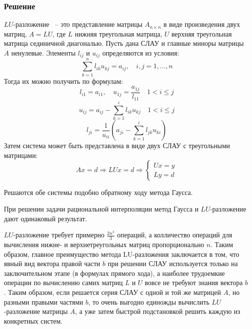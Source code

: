 \documentclass[a4paper, fontsize=14pt]{article}
\begin{document}
\subsubsection*{Решение}
$LU$-разложение ~-- это представление матрицы $A_{n\times n}$ в виде произведения двух матриц, $A = LU$, где $L$ нижняя треугольная матрица, $U$ верхняя треугольная матрица сединичной диагональю.
Пусть дана СЛАУ и главные миноры матрицы $A$ ненулевые. Элементы $l_{ij}$ и $u_{ij}$ определяются из условия:
\begin{equation*}
    \sum_{k=1}^{n} l_{ik} u_{kj} = a_{ij}, \quad i,j = 1, \dots, n
\end{equation*}
Тогда их можно получить по формулам:
\begin{equation*}
    l_{i1} = a_{i1}, \quad u_{1j} = \frac{a_{1j}}{l_{11}} \quad 1 < i \leq j
\end{equation*}
\begin{equation*}
    u_{ij} = a_{ij} - \sum_{k=1}^i l_{ik} u_{kj} \quad 1 < i \leq j
\end{equation*}
\begin{equation*}
    l_{ji} = \frac{1}{u_{ii}} \left(a_{ji} - \sum_{k=1}^i l_{jk} u_{ki}\right)
\end{equation*}
Затем система может быть представлена в виде двух СЛАУ с треугольными матрицами:
\begin{equation*}
    Ax = d \Rightarrow LUx = d \Rightarrow
    \begin{cases}
        Ux = y \\
        Ly = d
    \end{cases}
\end{equation*}

Решаются обе системы подобно обратному ходу метода Гаусса.

При решении задачи рациональной интерполяции метод Гаусса и $LU$-разложение дают одинаковый результат.

$LU$-разложение требует примерно $\frac{2 n^3}{3}$ операций, а колличество операций для вычисления нижне- и верхнетреугольных матриц пропорционально $n$.
Таким образом, главное преимущество метода LU-разложения заключается в том,
что явный вид вектора правой части $b$ при решении СЛАУ
используется только на заключительном этапе (в формулах
прямого хода), а наиболее трудоемкие операции по вычислению
самих матриц $L$ и $U$ вовсе не требуют знания вектора $b$. Таким
образом, если решается серия СЛАУ с одной и той же матрицей
$A$, но разными правыми частями $b$, то очень
выгодно единожды вычислить $LU$-разложение матрицы $A$, а уже
затем быстрой подстановкой решить каждую из конкретных
систем.
\end{document}
